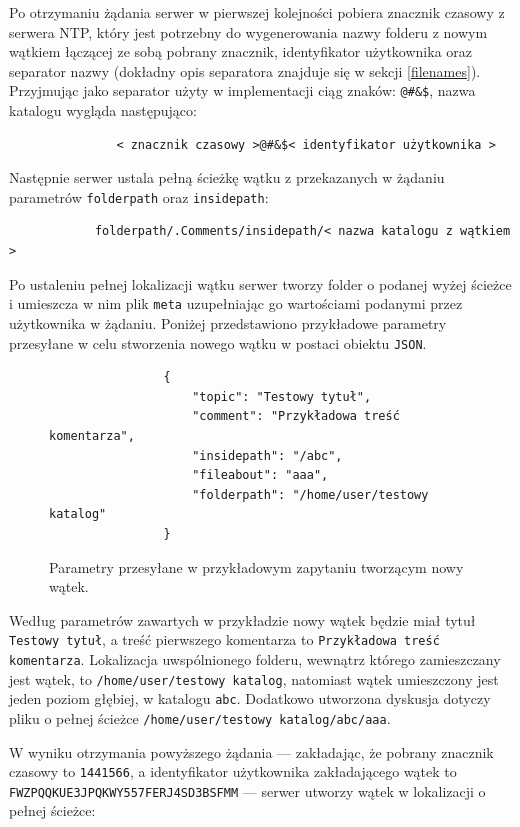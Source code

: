 \documentclass[polish,a4paper,twoside]{ppfcmthesis}
\begin{document}
Po otrzymaniu żądania serwer w pierwszej kolejności pobiera znacznik czasowy z serwera NTP, który jest potrzebny do wygenerowania nazwy folderu z nowym wątkiem łączącej ze sobą pobrany znacznik, identyfikator użytkownika oraz separator nazwy (dokładny opis separatora znajduje się w sekcji \ref{filenames}). Przyjmując jako separator użyty w implementacji ciąg znaków: \texttt{@\#\&\$}, nazwa katalogu wygląda następująco:

\begin{verbatim}
               < znacznik czasowy >@#&$< identyfikator użytkownika >
\end{verbatim}

Następnie serwer ustala pełną ścieżkę wątku z przekazanych w żądaniu parametrów \texttt{folderpath} oraz \texttt{insidepath}:

\begin{verbatim}
            folderpath/.Comments/insidepath/< nazwa katalogu z wątkiem >
\end{verbatim}

Po ustaleniu pełnej lokalizacji wątku serwer tworzy folder o podanej wyżej ścieżce i umieszcza w nim plik \texttt{meta} uzupełniając go wartościami podanymi przez użytkownika w żądaniu. Poniżej przedstawiono przykładowe parametry przesyłane w celu stworzenia nowego wątku w postaci obiektu \texttt{JSON}.

\begin{figure}[htb]
\begin{verbatim}
                {
                    "topic": "Testowy tytuł", 
                    "comment": "Przykładowa treść komentarza", 
                    "insidepath": "/abc", 
                    "fileabout": "aaa", 
                    "folderpath": "/home/user/testowy katalog"
                }
\end{verbatim}
  \caption{Parametry przesyłane w przykładowym zapytaniu tworzącym nowy wątek.}
\end{figure}

Według parametrów zawartych w przykładzie nowy wątek będzie miał tytuł \texttt{Testowy tytuł}, a treść pierwszego komentarza to \texttt{Przykładowa treść komentarza}. Lokalizacja uwspólnionego folderu, wewnątrz którego zamieszczany jest wątek, to \texttt{/home/user/\-testowy katalog}, natomiast wątek umieszczony jest jeden poziom głębiej, w katalogu \texttt{abc}. Dodatkowo utworzona dyskusja dotyczy pliku o pełnej ścieżce \texttt{/home/user/\-testowy katalog/\-abc/aaa}.

W wyniku otrzymania powyższego żądania --- zakładając, że pobrany znacznik czasowy to \texttt{1441566}, a identyfikator użytkownika zakładającego wątek to \texttt{FWZPQQKU\-E3JPQKWY5\-57FERJ4S\-D3BSFMM} --- serwer utworzy wątek w lokalizacji o pełnej ścieżce:
\end{document}
